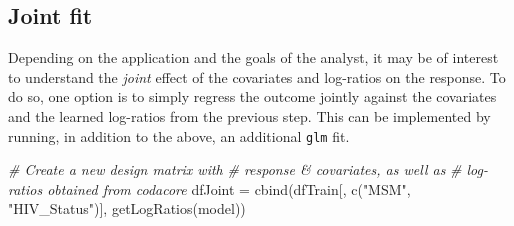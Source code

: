 \documentclass[
]{article}
\newenvironment{Shaded}{\begin{snugshade}}{\end{snugshade}}
\newcommand{\CommentTok}[1]{\textcolor[rgb]{0.56,0.35,0.01}{\textit{#1}}}
\newcommand{\FunctionTok}[1]{\textcolor[rgb]{0.00,0.00,0.00}{#1}}
\newcommand{\NormalTok}[1]{#1}
\newcommand{\OtherTok}[1]{\textcolor[rgb]{0.56,0.35,0.01}{#1}}
\newcommand{\StringTok}[1]{\textcolor[rgb]{0.31,0.60,0.02}{#1}}
\begin{document}
\hypertarget{joint-fit}{%
\subsection{Joint fit}\label{joint-fit}}

Depending on the application and the goals of the analyst, it may be of
interest to understand the \emph{joint} effect of the covariates and
log-ratios on the response. To do so, one option is to simply regress
the outcome jointly against the covariates and the learned log-ratios
from the previous step. This can be implemented by running, in addition
to the above, an additional \texttt{glm} fit.

\begin{Shaded}
\begin{Highlighting}[]
\CommentTok{\# Create a new design matrix with}
\CommentTok{\# response \& covariates, as well as}
\CommentTok{\# log{-}ratios obtained from codacore}
\NormalTok{dfJoint }\OtherTok{=} \FunctionTok{cbind}\NormalTok{(dfTrain[, }\FunctionTok{c}\NormalTok{(}\StringTok{"MSM"}\NormalTok{, }\StringTok{"HIV\_Status"}\NormalTok{)],}
    \FunctionTok{getLogRatios}\NormalTok{(model))}


\end{Highlighting}
\end{Shaded}
\end{document}
